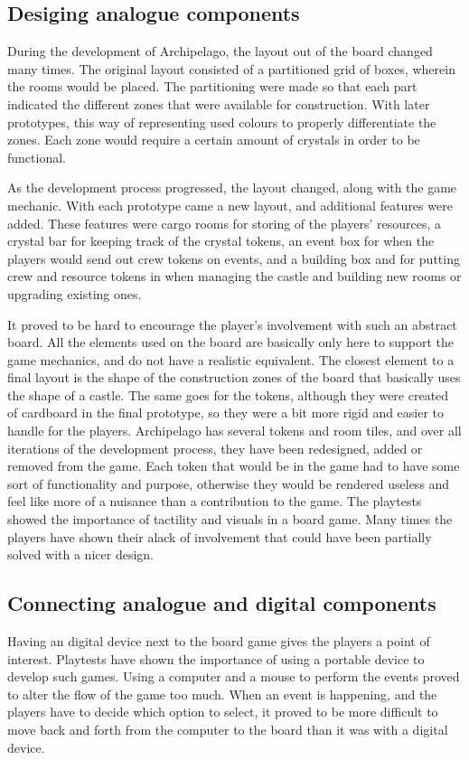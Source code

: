 \subsection{Desiging analogue components}
During the development of Archipelago, the layout out of the board changed many times. The original layout consisted of a partitioned grid of boxes, wherein the rooms would be placed. The partitioning were made so that each part indicated the different zones that were available for construction. With later prototypes, this way of representing used colours to properly differentiate the zones. Each zone would require a certain amount of crystals in order to be functional. 

As the development process progressed, the layout changed, along with the game mechanic. With each prototype came a new layout, and additional features were added. These features were cargo rooms for storing of the players' resources, a crystal bar for keeping track of the crystal tokens, an event box for when the players would send out crew tokens on events, and a building box and for putting crew and resource tokens in when managing the castle and building new rooms or upgrading existing ones. 

It proved to be hard to encourage the player's involvement with such an abstract board. All the elements used on the board are basically only here to support the game mechanics, and do not have a realistic equivalent. The closest element to a final layout is the shape of the construction zones of the board that basically uses the shape of a castle. The same goes for the tokens, although they were created of cardboard in the final prototype, so they were a bit more rigid and easier to handle for the players. Archipelago has several tokens and room tiles, and over all iterations of the development process, they have been redesigned, added or removed from the game. Each token that would be in the game had to have some sort of functionality and purpose, otherwise they would be rendered useless and feel like more of a nuisance than a contribution to the game. The playtests showed the importance of tactility and visuals in a board game. Many times the players have shown their alack of involvement that could have been partially solved with a nicer design.

\subsection{Connecting analogue and digital components}
Having an digital device next to the board game gives the players a point of interest. Playtests have shown the importance of using a portable device to develop such games. Using a computer and a mouse to perform the events proved to alter the flow of the game too much. When an event is happening, and the players have to decide which option to select, it proved to be more difficult to move back and forth from the computer to the board than it was with a digital device.

